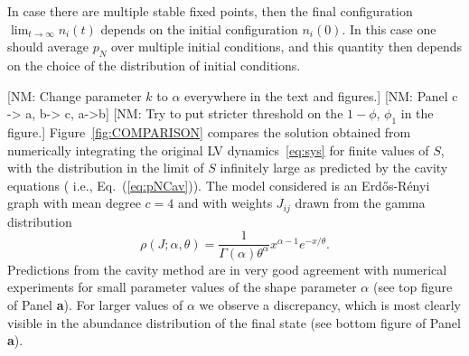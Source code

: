 \documentclass[11pt,a4paper]{article}
\DeclareMathOperator*{\argmin}{arg\,min}
\newcommand{\nm}[1]{{\color{red}[NM: #1]}}
\begin{document}
In case there are multiple stable fixed points, then the final configuration $\lim_{t\rightarrow \infty}n_i(t)$ depends on the initial configuration $n_i(0)$.   In this case one should average $p_N$  over multiple initial conditions, and this quantity then depends on the choice of the distribution of initial conditions.




\nm{Change parameter $k$ to $\alpha$ everywhere in the text and figures.}
\nm{Panel c -> a, b-> c, a->b}
\nm{Try to put stricter threshold on the $1-\phi$, $\phi_1$ in the figure.}
Figure~\ref{fig:COMPARISON} compares the solution obtained from numerically integrating the original LV dynamics~\eqref{eq:sys} for finite values of $S$,  with the distribution in the limit of $S$ infinitely large as predicted  by  the cavity equations (  i.e., Eq.~(\ref{eq:pNCav})).   The model considered is an Erd\H{o}s-R\'{e}nyi graph with mean degree $c=4$ and with weights $J_{ij}$ drawn from the gamma distribution
\begin{equation}
\rho(J;\alpha, \theta) = \frac{1}{\Gamma(\alpha) \theta^\alpha} x^{\alpha-1} e^{-x/\theta}. \label{eq:rhoGamma}
\end{equation}
Predictions from the cavity method are in very good agreement with numerical experiments for small parameter values of the shape parameter $\alpha$ (see top figure of Panel {\bf a}).  For larger values of  $\alpha$ we observe a discrepancy, which is most clearly visible in the abundance distribution of the final state (see  bottom figure of Panel {\bf a}).
\end{document}
